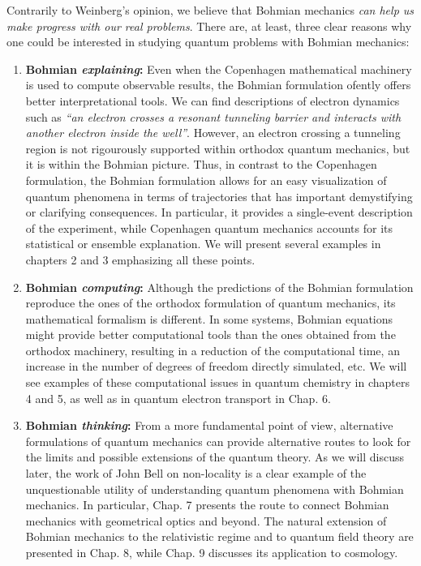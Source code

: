 \documentclass[onecolumn,nofootinbib, secnumarabic, amsmath, nobibnotes,12pt,aps,pra]{revtex4-1}
\begin{document}
Contrarily to Weinberg's opinion, we believe that Bohmian mechanics \emph{can help us make progress with our real problems}. There are, at least, three clear reasons why one could be interested in studying quantum problems with Bohmian mechanics:
\begin{enumerate}
\item \textbf{Bohmian \emph{explaining}:} Even when the Copenhagen mathematical machinery is used to compute observable results, the Bohmian formulation ofently offers better interpretational tools. We can find descriptions of electron dynamics such as \emph{``an electron crosses a resonant tunneling barrier and interacts with another electron inside the well''}. However, an electron crossing a tunneling region is not rigourously supported within orthodox quantum mechanics, but it is within the Bohmian picture.
Thus, in contrast to the Copenhagen formulation, the Bohmian formulation allows for an easy visualization of quantum phenomena in terms of trajectories that has important demystifying or clarifying consequences. In particular, it provides a single-event description of the experiment, while Copenhagen quantum mechanics accounts for its statistical or ensemble explanation. We will present several examples in chapters 2 and 3 emphasizing all these points. \\

\item \textbf{Bohmian \emph{computing}:} Although the predictions of the Bohmian formulation reproduce the ones of the orthodox formulation of quantum mechanics, its mathematical formalism is different. In some systems, Bohmian equations might provide better computational tools than the ones obtained from the orthodox machinery, resulting in a reduction of the computational time, an increase in the number of degrees of freedom directly simulated, etc.  We will see examples of these computational issues in quantum chemistry in chapters 4 and 5, as well as in quantum electron transport in Chap. 6.\\


\item \textbf{Bohmian \emph{thinking}:} From a more fundamental point of view, alternative formulations of quantum mechanics can provide alternative routes to look for the limits and possible extensions of the quantum theory. As we will discuss later, the work of John Bell on non-locality is a clear example of the unquestionable utility of understanding quantum phenomena with Bohmian mechanics. In particular, Chap. 7 presents the route to connect Bohmian mechanics with geometrical optics and beyond. The natural extension of Bohmian mechanics to the relativistic regime and to quantum field theory are presented in Chap. 8, while Chap. 9 discusses its application to cosmology.
\end{enumerate}
\end{document}
